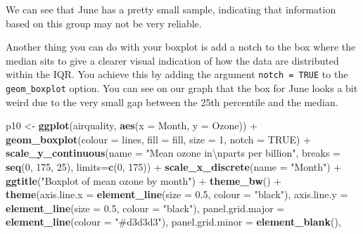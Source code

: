 \documentclass[]{article}
\newenvironment{Shaded}{\begin{snugshade}}{\end{snugshade}}
\newcommand{\KeywordTok}[1]{\textcolor[rgb]{0.13,0.29,0.53}{\textbf{{#1}}}}
\newcommand{\DataTypeTok}[1]{\textcolor[rgb]{0.13,0.29,0.53}{{#1}}}
\newcommand{\DecValTok}[1]{\textcolor[rgb]{0.00,0.00,0.81}{{#1}}}
\newcommand{\FloatTok}[1]{\textcolor[rgb]{0.00,0.00,0.81}{{#1}}}
\newcommand{\CharTok}[1]{\textcolor[rgb]{0.31,0.60,0.02}{{#1}}}
\newcommand{\StringTok}[1]{\textcolor[rgb]{0.31,0.60,0.02}{{#1}}}
\newcommand{\OtherTok}[1]{\textcolor[rgb]{0.56,0.35,0.01}{{#1}}}
\newcommand{\NormalTok}[1]{{#1}}
\begin{document}
We can see that June has a pretty small sample, indicating that
information based on this group may not be very reliable.

Another thing you can do with your boxplot is add a notch to the box
where the median sits to give a clearer visual indication of how the
data are distributed within the IQR. You achieve this by adding the
argument \texttt{notch\ =\ TRUE} to the \texttt{geom\_boxplot} option.
You can see on our graph that the box for June looks a bit weird due to
the very small gap between the 25th percentile and the median.

\begin{Shaded}
\begin{Highlighting}[]
\NormalTok{p10 <-}\StringTok{ }\KeywordTok{ggplot}\NormalTok{(airquality, }\KeywordTok{aes}\NormalTok{(}\DataTypeTok{x =} \NormalTok{Month, }\DataTypeTok{y =} \NormalTok{Ozone)) +}\StringTok{ }
\StringTok{        }\KeywordTok{geom_boxplot}\NormalTok{(}\DataTypeTok{colour =} \NormalTok{lines, }\DataTypeTok{fill =} \NormalTok{fill,}
                     \DataTypeTok{size =} \DecValTok{1}\NormalTok{, }\DataTypeTok{notch =} \OtherTok{TRUE}\NormalTok{) +}
\StringTok{        }\KeywordTok{scale_y_continuous}\NormalTok{(}\DataTypeTok{name =} \StringTok{"Mean ozone in}\CharTok{\textbackslash{}n}\StringTok{parts per billion"}\NormalTok{,}
                              \DataTypeTok{breaks =} \KeywordTok{seq}\NormalTok{(}\DecValTok{0}\NormalTok{, }\DecValTok{175}\NormalTok{, }\DecValTok{25}\NormalTok{),}
                              \DataTypeTok{limits=}\KeywordTok{c}\NormalTok{(}\DecValTok{0}\NormalTok{, }\DecValTok{175}\NormalTok{)) +}
\StringTok{        }\KeywordTok{scale_x_discrete}\NormalTok{(}\DataTypeTok{name =} \StringTok{"Month"}\NormalTok{) +}
\StringTok{        }\KeywordTok{ggtitle}\NormalTok{(}\StringTok{"Boxplot of mean ozone by month"}\NormalTok{) +}
\StringTok{        }\KeywordTok{theme_bw}\NormalTok{() +}
\StringTok{        }\KeywordTok{theme}\NormalTok{(}\DataTypeTok{axis.line.x =} \KeywordTok{element_line}\NormalTok{(}\DataTypeTok{size =} \FloatTok{0.5}\NormalTok{, }\DataTypeTok{colour =} \StringTok{"black"}\NormalTok{), }
              \DataTypeTok{axis.line.y =} \KeywordTok{element_line}\NormalTok{(}\DataTypeTok{size =} \FloatTok{0.5}\NormalTok{, }\DataTypeTok{colour =} \StringTok{"black"}\NormalTok{),}
              \DataTypeTok{panel.grid.major =} \KeywordTok{element_line}\NormalTok{(}\DataTypeTok{colour =} \StringTok{"#d3d3d3"}\NormalTok{), }
              \DataTypeTok{panel.grid.minor =} \KeywordTok{element_blank}\NormalTok{(), }

\end{Highlighting}
\end{Shaded}
\end{document}
